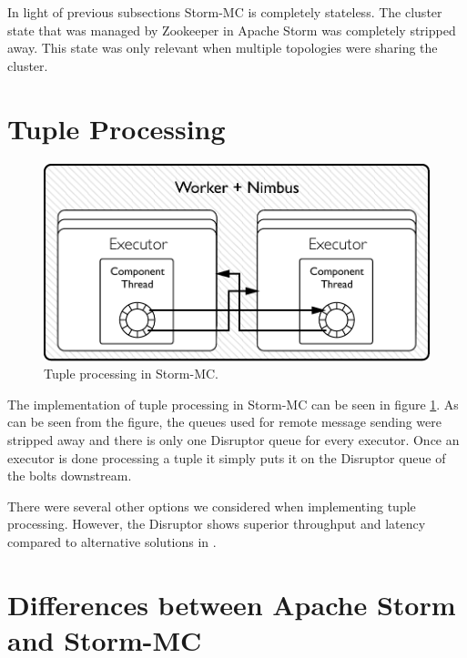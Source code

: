 In light of previous subsections Storm-MC is completely stateless. The cluster state that was managed by Zookeeper in Apache Storm was completely stripped away. This state was only relevant when multiple topologies were sharing the cluster.

\section{Tuple Processing}


\begin{figure}[!htb]
	\centering
	\includegraphics[scale=0.7]{pdf/worker_inside_mc.pdf}
	\caption{Tuple processing in Storm-MC.}
	\label{fig:worker_inside_mc}
\end{figure}

The implementation of tuple processing in Storm-MC can be seen in figure \ref{fig:worker_inside_mc}. As can be seen from the figure, the queues used for remote message sending were stripped away and there is only one Disruptor queue for every executor. Once an executor is done processing a tuple it simply puts it on the Disruptor queue of the bolts downstream.

There were several other options we considered when implementing tuple processing. However, the Disruptor shows superior throughput and latency compared to alternative solutions in \cite{something}.


\section{Differences between Apache Storm and Storm-MC}

